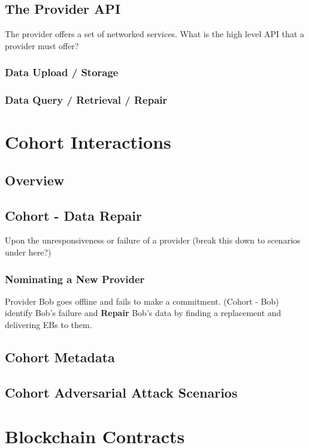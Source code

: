 \documentclass{article}
\begin{document}
\subsection{The Provider API}
The provider offers a set of networked services.  What is the high level API that a provider must offer?
\subsubsection{Data Upload / Storage}
\subsubsection{Data Query / Retrieval / Repair}

\section{Cohort Interactions}

\subsection{Overview}

\subsection{Cohort - Data Repair}
Upon the unresponsiveness or failure of a provider
(break this down to scenarios under here?)
\subsubsection{Nominating a New Provider}
Provider Bob goes offline and fails to make a commitment. (Cohort - Bob) identify Bob’s failure and \textbf{Repair} Bob’s data by finding a replacement and delivering EBs to them.

\subsection{Cohort Metadata}

\subsection{Cohort Adversarial Attack Scenarios}

\section{Blockchain Contracts}
\end{document}
